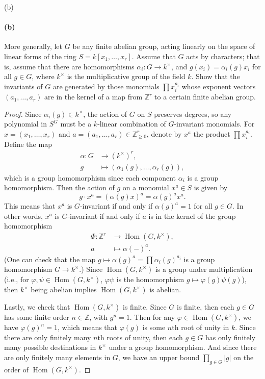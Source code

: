 \documentclass[12pt]{article}
\newlength{\myparskip}
\newenvironment{fullbox}{\begin{lrbox}{\savefullbox}\begin{minipage}{\dimexpr\textwidth-2\fboxsep\relax}\setlength{\parskip}{\myparskip}}{\end{minipage}\end{lrbox}\framebox[\textwidth]{\usebox{\savefullbox}}}
\newenvironment{pbox}[1][]{\begin{fullbox}\ifx#1\empty\else\paragraph{#1}\fi}{\end{fullbox}}
\newcommand{\Z}{\mathbb{Z}}
\renewcommand{\phi}{\varphi}
\newcommand{\<}{\langle}
\renewcommand{\>}{\rangle}
\DeclareMathOperator{\Hom}{Hom}
\begin{document}
\begin{pbox}[(b)]
    More generally, let $G$ be any finite abelian group, acting linearly on the space of linear forms of the ring $S = k[x_1, \dots, x_r]$. Assume that $G$ acts by characters; that is, assume that there are homomorphisms $\alpha_i : G \to k^\times$, and $g(x_i) = \alpha_i(g)x_i$ for all $g \in G$, where $k^\times$ is the multiplicative group of the field $k$. Show that the invariants of $G$ are generated by those monomials $\prod x_i^{a_i}$ whose exponent vectors $(a_1, \dots, a_r)$ are in the kernel of a map from $\Z^r$ to a certain finite abelian group. 
\end{pbox}

\begin{proof}
    Since $\alpha_i(g) \in k^\times$, the action of $G$ on $S$ preserves degrees, so any polynomial in $S^G$ must be a $k$-linear combination of $G$-invariant monomials. For $x = (x_1, \dots, x_r)$ and $a = (a_1, \dots, a_r) \in \Z_{\geq 0}^r$, denote by $x^a$ the product $\prod x_i^{a_i}$. Define the map
    \begin{align*}
        \alpha : G &\to (k^\times)^r, \\
            g &\mapsto (\alpha_1(g), \dots, \alpha_r(g)),
    \end{align*}
    which is a group homomorphism since each component $\alpha_i$ is a group homomorphism. Then the action of $g$ on a monomial $x^a \in S$ is given by
    \[
        g \cdot x^a
            = (\alpha(g)x)^a
            = \alpha(g)^a x^a.
    \]
    This means that $x^a$ is $G$-invariant if and only if $\alpha(g)^a = 1$ for all $g \in G$. In other words, $x^a$ is $G$-invariant if and only if $a$ is in the kernel of the group homomorphism
    \begin{align*}
        \Phi : \Z^r &\to \Hom(G, k^\times), \\
            a &\mapsto \alpha(-)^a.
    \end{align*}
    (One can check that the map $g \mapsto \alpha(g)^a = \prod \alpha_i(g)^{a_i}$ is a group homomorphism $G \to k^\times$.) Since $\Hom(G, k^\times)$ is a group under multiplication (i.e., for $\phi, \psi \in \Hom(G, k^\times)$, $\phi\psi$ is the homomorphism $g \mapsto \phi(g)\psi(g)$), then $k^\times$ being abelian implies $\Hom(G, k^\times)$ is abelian.

    Lastly, we check that $\Hom(G, k^\times)$ is finite. Since $G$ is finite, then each $g \in G$ has some finite order $n \in \Z$, with $g^n = 1$. Then for any $\phi \in \Hom(G, k^\times)$, we have $\phi(g)^n = 1$, which means that $\phi(g)$ is some $n$th root of unity in $k$. Since there are only finitely many $n$th roots of unity, then each $g \in G$ has only finitely many possible destinations in $k^\times$ under a group homomorphism. And since there are only finitely many elements in $G$, we have an upper bound $\prod_{g \in G} |g|$ on the order of $\Hom(G, k^\times)$.

\end{proof}
\end{document}
